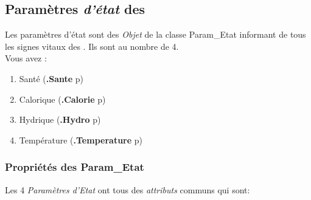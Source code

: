 \documentclass[french]{report}
\begin{document}
\subsection{Paramètres \textit{d'état} des \CoCiX}\label{param_etat}
Les paramètres d'état sont des \textit{Objet} de la classe Param\_Etat informant de tous les signes vitaux des \CoCiX. Ils sont au nombre de 4.\\

Vous avez : 
\begin{enumerate}
\item Santé (\textbf{.Sante} p\pageref{sante})
\item Calorique (\textbf{.Calorie} p\pageref{alimentation})
\item Hydrique (\textbf{.Hydro} p\pageref{hydro})
\item Température (\textbf{.Temperature} p\pageref{temperature})
\end{enumerate}

\subsubsection{Propriétés des Param\_Etat}
Les 4 \textit{Paramètres d'Etat} ont tous des \textit{attributs} communs qui sont:\\
\end{document}
